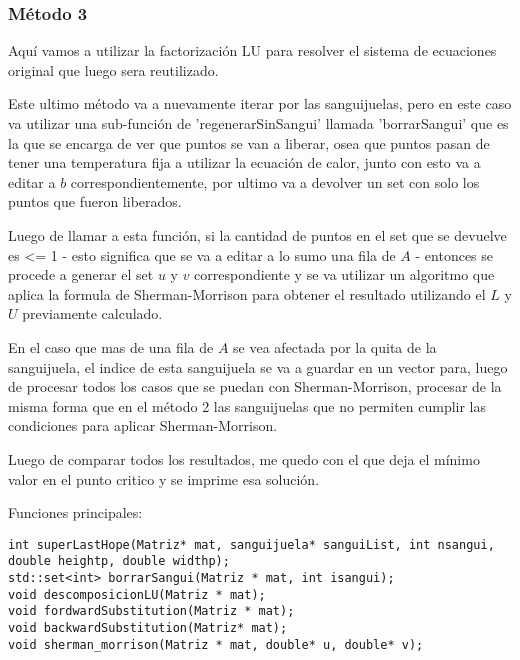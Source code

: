 \documentclass[a4paper]{article}
\begin{document}
\subsubsection{Método 3}
Aquí vamos a utilizar la factorización LU para resolver el sistema de ecuaciones original que luego sera reutilizado.\par
Este ultimo método va a nuevamente iterar por las sanguijuelas, pero en este caso va utilizar una sub-función de 'regenerarSinSangui' llamada 'borrarSangui' que es la que se encarga de ver que puntos se van a liberar, osea que puntos pasan de tener una temperatura fija a utilizar la ecuación de calor, junto con esto va a editar a $b$ correspondientemente, por ultimo va a devolver un set con solo los puntos que fueron liberados.\par
Luego de llamar a esta función, si la cantidad de puntos en el set que se devuelve es \textless = 1 - esto significa que se va a editar a lo sumo una fila de $A$ - entonces se procede a generar el set $u$ y $v$ correspondiente y se va utilizar un algoritmo que aplica la formula de Sherman-Morrison para obtener el resultado utilizando el $L$ y $U$ previamente calculado.\par
En el caso que mas de una fila de $A$ se vea afectada por la quita de la sanguijuela, el indice de esta sanguijuela se va a guardar en un vector para, luego de procesar todos los casos que se puedan con Sherman-Morrison, procesar de la misma forma que en el método 2 las sanguijuelas que no permiten cumplir las condiciones para aplicar Sherman-Morrison.\par
Luego de comparar todos los resultados, me quedo con el que deja el mínimo valor en el punto critico y se imprime esa solución.\par
\smallskip
Funciones principales:
\begin{lstlisting}
int superLastHope(Matriz* mat, sanguijuela* sanguiList, int nsangui, double heightp, double widthp);
std::set<int> borrarSangui(Matriz * mat, int isangui);
void descomposicionLU(Matriz * mat);
void fordwardSubstitution(Matriz * mat);
void backwardSubstitution(Matriz* mat);
void sherman_morrison(Matriz * mat, double* u, double* v); 
\end{lstlisting}
\end{document}
